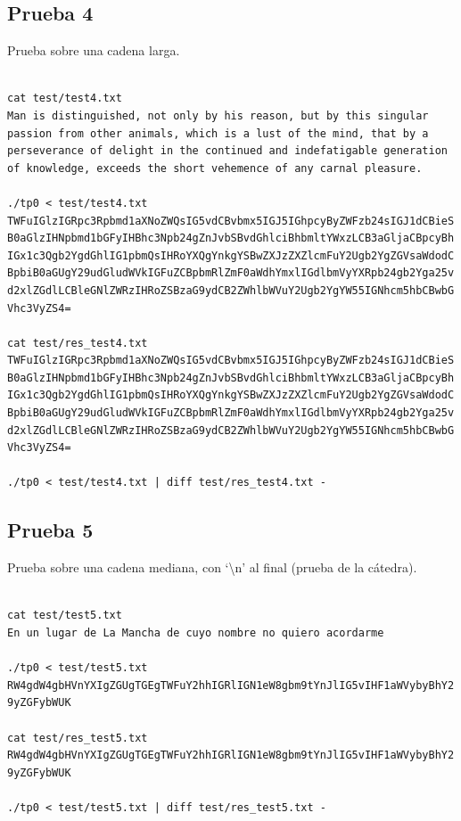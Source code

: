 \documentclass[titlepage,a4paper]{article}
\begin{document}
\subsection{Prueba 4}
Prueba sobre una cadena larga.
\begin{lstlisting}[style=test_run_style]

cat test/test4.txt
Man is distinguished, not only by his reason, but by this singular passion from other animals, which is a lust of the mind, that by a perseverance of delight in the continued and indefatigable generation of knowledge, exceeds the short vehemence of any carnal pleasure.

./tp0 < test/test4.txt
TWFuIGlzIGRpc3Rpbmd1aXNoZWQsIG5vdCBvbmx5IGJ5IGhpcyByZWFzb24sIGJ1dCBieS 
B0aGlzIHNpbmd1bGFyIHBhc3Npb24gZnJvbSBvdGhlciBhbmltYWxzLCB3aGljaCBpcyBh 
IGx1c3Qgb2YgdGhlIG1pbmQsIHRoYXQgYnkgYSBwZXJzZXZlcmFuY2Ugb2YgZGVsaWdodC 
BpbiB0aGUgY29udGludWVkIGFuZCBpbmRlZmF0aWdhYmxlIGdlbmVyYXRpb24gb2Yga25v 
d2xlZGdlLCBleGNlZWRzIHRoZSBzaG9ydCB2ZWhlbWVuY2Ugb2YgYW55IGNhcm5hbCBwbG 
Vhc3VyZS4=

cat test/res_test4.txt
TWFuIGlzIGRpc3Rpbmd1aXNoZWQsIG5vdCBvbmx5IGJ5IGhpcyByZWFzb24sIGJ1dCBieS 
B0aGlzIHNpbmd1bGFyIHBhc3Npb24gZnJvbSBvdGhlciBhbmltYWxzLCB3aGljaCBpcyBh 
IGx1c3Qgb2YgdGhlIG1pbmQsIHRoYXQgYnkgYSBwZXJzZXZlcmFuY2Ugb2YgZGVsaWdodC 
BpbiB0aGUgY29udGludWVkIGFuZCBpbmRlZmF0aWdhYmxlIGdlbmVyYXRpb24gb2Yga25v 
d2xlZGdlLCBleGNlZWRzIHRoZSBzaG9ydCB2ZWhlbWVuY2Ugb2YgYW55IGNhcm5hbCBwbG 
Vhc3VyZS4=

./tp0 < test/test4.txt | diff test/res_test4.txt -

\end{lstlisting}

\subsection{Prueba 5}
Prueba sobre una cadena mediana, con `\textbackslash n' al final (prueba de la cátedra).
\begin{lstlisting}[style=test_run_style]

cat test/test5.txt
En un lugar de La Mancha de cuyo nombre no quiero acordarme

./tp0 < test/test5.txt
RW4gdW4gbHVnYXIgZGUgTGEgTWFuY2hhIGRlIGN1eW8gbm9tYnJlIG5vIHF1aWVybyBhY2 
9yZGFybWUK

cat test/res_test5.txt
RW4gdW4gbHVnYXIgZGUgTGEgTWFuY2hhIGRlIGN1eW8gbm9tYnJlIG5vIHF1aWVybyBhY2 
9yZGFybWUK

./tp0 < test/test5.txt | diff test/res_test5.txt -

\end{lstlisting}
\end{document}
